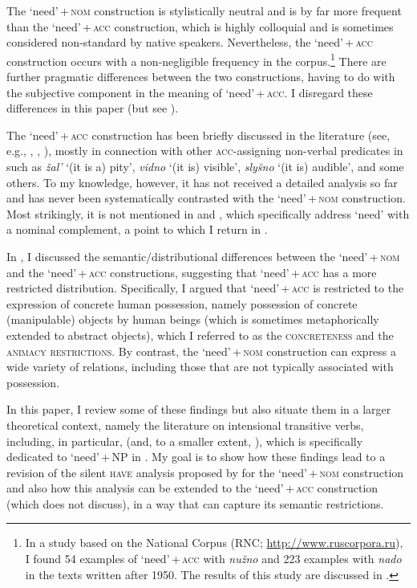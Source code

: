 \documentclass[output=paper]{langscibook}
\begin{document}
\noindent The `need'\,+\,\textsc{nom} construction is stylistically neutral and is by far more frequent than the `need'\,+\,\textsc{acc} construction, which is highly colloquial and is sometimes considered non-standard by native speakers. Nevertheless, the `need'\,+\,\textsc{acc} construction occurs with a non-negligible frequency in the corpus.\footnote{In a study based on the  National Corpus (RNC; \url{http://www.ruscorpora.ru}), I found 54 examples of `need'\,+\,\textsc{acc} with \textit{nužno} and 223 examples with \textit{nado} in the texts written after 1950. The results of this study are discussed in \citet{Knyazev2020}.} There are further pragmatic differences between the two constructions, having to do with the subjective component in the meaning of `need'\,+\,\textsc{acc}. I disregard these differences in this paper (but see \citealt{Knyazev2020}).

The `need'\,+\,\textsc{acc} construction has been briefly discussed in the literature (see, e.g., \citealt[325--327]{Svedova1980}, \citealt[213]{Pesetsky1982}, \citealt[28]{Mikaelian.Roudet1999}), mostly in connection with other \textsc{acc}-assigning non-verbal predicates in  such as \textit{žal'} `(it is a) pity', \textit{vidno} `(it is) visible', \textit{slyšno} `(it is) audible', and some others. To my knowledge, however, it has not received a detailed analysis so far and has never been systematically contrasted with the `need'\,+\,\textsc{nom} construction. Most strikingly, it is not mentioned in \citet{Harves2008} and \citet{Harves.Kayne2012}, which specifically address  `need' with a nominal complement, a point to which I return in .

In \citet{Knyazev2020}, I discussed the semantic/distributional differences between the `need'\,+\,\textsc{nom} and the `need'\,+\,\textsc{acc} constructions, suggesting that `need'\,+\,\textsc{acc} has a more restricted distribution. Specifically, I argued that `need'\,+\,\textsc{acc} is restricted to the expression of concrete human possession, namely possession of concrete (manipulable) objects by human beings (which is sometimes metaphorically extended to abstract objects), which I referred to as the \textsc{concreteness} and the \textsc{animacy restrictions}. By contrast, the `need'\,+\,\textsc{nom} construction can express a wide variety of relations, including those that are not typically associated with possession.

In this paper, I review some of these findings but also situate them in a larger theoretical context, namely the literature on intensional transitive verbs, including, in particular, \citet{Harves2008} (and, to a smaller extent, \citealt{Harves.Kayne2012}), which is specifically dedicated to `need'\,+\,NP in . My goal is to show how these findings lead to a revision of the silent \textsc{have} analysis proposed by \citet{Harves2008} for the `need'\,+\,\textsc{nom} construction and also how this analysis can be extended to the `need'\,+\,\textsc{acc} construction (which \citeauthor{Harves2008} does not discuss), in a way that can capture its semantic restrictions.
\end{document}
